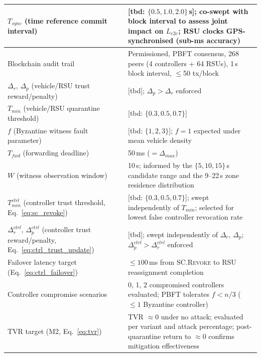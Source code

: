 \documentclass[12pt, a4paper]{report}
\begin{document}
{{\begin{longtable}{|m{5.0cm}|m{9.0cm}|}
            \hline
            $T_{sync}$ (time reference commit interval) & [tbd: $\{0.5, 1.0, 2.0\}$\,s]; co-swept with block interval to assess joint impact on $L_{e2e}$; RSU clocks GPS-synchronised (sub-ms accuracy) \\
            \hline
            Blockchain audit trail & Permissioned, PBFT consensus, 268 peers (4 controllers + 64 RSUs), 1\,s block interval, $\leq$50 tx/block \\
            \hline
            $\Delta_r$, $\Delta_p$ (vehicle/RSU trust reward/penalty) & [tbd]; $\Delta_p > \Delta_r$ enforced \\
            \hline
            $T_{min}$ (vehicle/RSU quarantine threshold) & [tbd: $\{0.3, 0.5, 0.7\}$] \\
            \hline
            $f$ (Byzantine witness fault parameter) & [tbd: $\{1, 2, 3\}$]; $f{=}1$ expected under mean vehicle density \\
            \hline
            $T_{fwd}$ (forwarding deadline) & 50\,ms ($= \Delta_{max}$) \\
            \hline
            $W$ (witness observation window) & 10\,s; informed by the $\{5, 10, 15\}$\,s candidate range and the 9--22\,s zone residence distribution \\
                
    
             \hline
            $T_{min}^{ctrl}$ (controller trust threshold,
            Eq.~\ref{eq:sc_revoke}) &
            [tbd: $\{0.3, 0.5, 0.7\}$]; swept
            independently of $T_{min}$; selected for
            lowest false controller revocation rate \\
            \hline
            $\Delta_r^{ctrl}$, $\Delta_p^{ctrl}$
            (controller trust reward/penalty,
            Eq.~\ref{eq:ctrl_trust_update}) &
            [tbd]; swept independently of $\Delta_r$,
            $\Delta_p$; $\Delta_p^{ctrl} >
            \Delta_r^{ctrl}$ enforced \\
            \hline
            Failover latency target
            (Eq.~\ref{eq:ctrl_failover}) &
            $\leq 100$\,ms from \textsc{SC.Revoke}
            to RSU reassignment completion \\
            \hline
            Controller compromise scenarios &
            0, 1, 2 compromised controllers evaluated;
            PBFT tolerates $f < n/3$ ($\leq 1$
            Byzantine controller) \\
             \hline
           TVR target (M2, Eq.~\ref{eq:tvr}) &
            TVR $\approx 0$ under no attack;
            evaluated per variant and attack percentage;
            post-quarantine return to $\approx 0$
            confirms mitigation effectiveness \\


\end{longtable}}}
\end{document}
